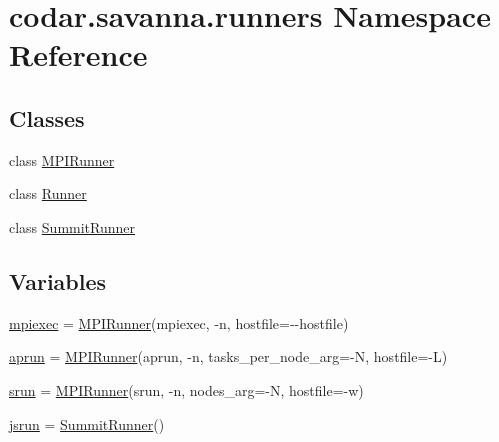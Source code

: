 \hypertarget{namespacecodar_1_1savanna_1_1runners}{}\section{codar.\+savanna.\+runners Namespace Reference}
\label{namespacecodar_1_1savanna_1_1runners}
\subsection*{Classes}
\begin{DoxyCompactItemize}
\item 
class \hyperlink{classcodar_1_1savanna_1_1runners_1_1_m_p_i_runner}{M\+P\+I\+Runner}
\item 
class \hyperlink{classcodar_1_1savanna_1_1runners_1_1_runner}{Runner}
\item 
class \hyperlink{classcodar_1_1savanna_1_1runners_1_1_summit_runner}{Summit\+Runner}
\end{DoxyCompactItemize}
\subsection*{Variables}
\begin{DoxyCompactItemize}
\item 
\hyperlink{namespacecodar_1_1savanna_1_1runners_a253b35f7f2855a4ba3bb161c9e3ff1cd}{mpiexec} = \hyperlink{classcodar_1_1savanna_1_1runners_1_1_m_p_i_runner}{M\+P\+I\+Runner}(\textquotesingle{}mpiexec\textquotesingle{}, \textquotesingle{}-\/n\textquotesingle{}, hostfile=\textquotesingle{}-\/-\/hostfile\textquotesingle{})
\item 
\hyperlink{namespacecodar_1_1savanna_1_1runners_a7b4e5f219f78f5e43c89915f24c32d21}{aprun} = \hyperlink{classcodar_1_1savanna_1_1runners_1_1_m_p_i_runner}{M\+P\+I\+Runner}(\textquotesingle{}aprun\textquotesingle{}, \textquotesingle{}-\/n\textquotesingle{}, tasks\+\_\+per\+\_\+node\+\_\+arg=\textquotesingle{}-\/N\textquotesingle{}, hostfile=\textquotesingle{}-\/L\textquotesingle{})
\item 
\hyperlink{namespacecodar_1_1savanna_1_1runners_abc37053bb8c8a1d6bbdcfc5602a93e4d}{srun} = \hyperlink{classcodar_1_1savanna_1_1runners_1_1_m_p_i_runner}{M\+P\+I\+Runner}(\textquotesingle{}srun\textquotesingle{}, \textquotesingle{}-\/n\textquotesingle{}, nodes\+\_\+arg=\textquotesingle{}-\/N\textquotesingle{}, hostfile=\textquotesingle{}-\/w\textquotesingle{})
\item 
\hyperlink{namespacecodar_1_1savanna_1_1runners_afe9b7578576f631ee95c5f01d4ac371f}{jsrun} = \hyperlink{classcodar_1_1savanna_1_1runners_1_1_summit_runner}{Summit\+Runner}()
\end{DoxyCompactItemize}


